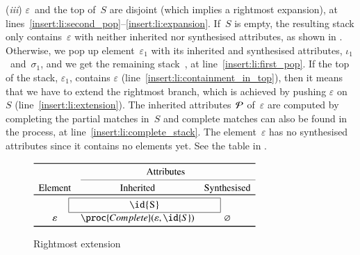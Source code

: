 (\emph{iii}) \(\varepsilon\)~and the top of~\(S\) are disjoint (which
implies a rightmost expansion), at
lines~\ref{insert:li:second_pop}--\ref{insert:li:expansion}. If~\(S\)
is empty, the resulting stack only contains~\(\varepsilon\) with
neither inherited nor synthesised attributes, as shown in
. Otherwise, we pop up element~\(\varepsilon_1\)
with its inherited and synthesised attributes,
\(\iota_1\)~and~\(\sigma_1\), and we get the remaining
stack~, at line~\ref{insert:li:first_pop}. If the top of the
stack, \(\varepsilon_1\), contains \(\varepsilon\)
(line~\ref{insert:li:containment_in_top}), then it means that we have
to extend the rightmost branch, which is achieved by pushing
\(\varepsilon\) on~\(S\) (line~\ref{insert:li:extension}). The
inherited attributes~\(\cal P\) of~\(\varepsilon\) are computed by
completing the partial matches in~\(S\) and complete matches can also
be found in the process, at line~\ref{insert:li:complete_stack}.  The
element~\(\varepsilon\) has no synthesised attributes since it
contains no elements yet. See the table in
.
\begin{figure}
\centering
\(
\begin{array}{ccc}
\toprule
& \multicolumn{2}{c}{\text{Attributes}}\\
\cmidrule(l){2-3}
\text{Element} & \text{Inherited} & \text{Synthesised}\\
\toprule
\multicolumn{3}{c}{\framebox[55mm][c]{\id{S}}}\\
\varepsilon & \proc{Complete} (\varepsilon, \id{S}) & \varnothing\\
\bottomrule
\end{array}
\)
\caption{Rightmost extension}
\label{fig:rightmost_extension_table}
\end{figure}

